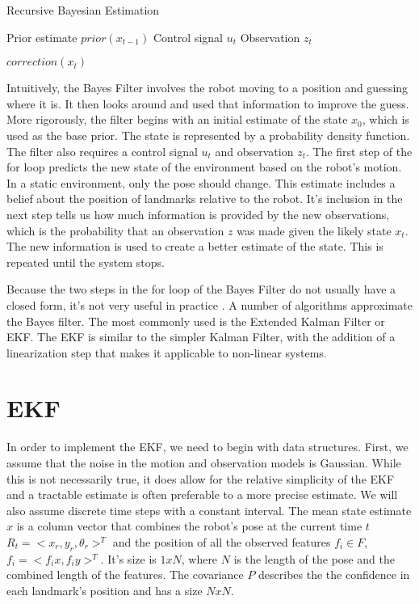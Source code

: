 \documentclass[12pt]{report}
\begin{document}
\begin{algorithm}     
\caption{Recursive Bayesian Estimation}  
\label{Bayes_Filter}   
\begin{algorithmic}         
    \Require Prior estimate $prior(x_{t-1})$ 
    \State Control signal $u_t$
    \State Observation $z_t$
    \EndFor

\State\Return $correction(x_t)$
\end{algorithmic}
\end{algorithm}

Intuitively, the Bayes Filter involves the robot moving to a position and guessing where it is.  It then looks around and used that information to improve the guess.  More rigorously, the filter begins with an initial estimate of the state $x_0$, which is used as the base prior.  The state is represented by a probability density function.  The filter also requires a control signal $u_t$ and observation $z_t$.  The first step of the for loop predicts the new state of the environment based on the robot's motion.  In a static environment, only the pose should change.  This estimate includes a belief about the position of landmarks relative to the robot.  It's inclusion in the next step tells us how much information is provided by the new observations, which is the probability that an observation $z$ was made given the likely state $x_t$.  The new information is used to create a better estimate of the state.  This is repeated until the system stops.  

Because the two steps in the for loop of the Bayes Filter do not usually have a closed form, it's not very useful in practice \cite{ThrunPR}.  A number of algorithms approximate the Bayes filter.  The most commonly used is the Extended Kalman Filter or EKF.  The EKF is similar to the simpler Kalman Filter, with the addition of a linearization step that makes it applicable to non-linear systems.  

\section{EKF}  
In order to implement the EKF, we need to begin with data structures.  First, we assume that the noise in the motion and observation models is Gaussian.  While this is not necessarily true, it does allow for the relative simplicity of the EKF and a tractable estimate is often preferable to a more precise estimate.  We will also assume discrete time steps with a constant interval.  The mean state estimate $x$ is a column vector that combines the robot's pose at the current time $t$ $R_t = <x_r, y_r, \theta_r>^T$ and the position of all the observed features $f_i \in F$, $f_i = <f_ix, f_iy>^T$.  It's size is $1xN$, where $N$ is the length of the pose and the combined length of the features.  The covariance $P$ describes the the confidence in each landmark's position and has a size $NxN$.
\end{document}
